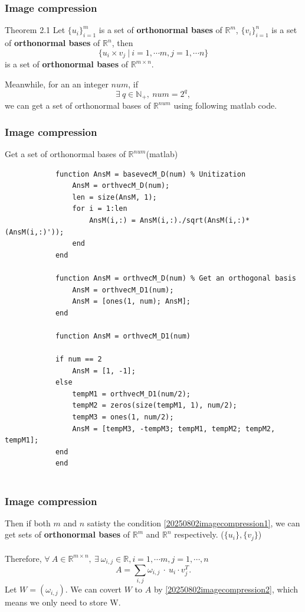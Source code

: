 \documentclass{beamer} %
\begin{document}
\begin{frame}
	\frametitle{Image compression}
	\begin{block}{Theorem 2.1}
		Let $\{u_{i}\}_{i=1}^{m}$ is a set of \textbf{orthonormal bases} of $\mathbb{R}^{m}$, $\{v_{i}\}_{i=1}^{n}$ is a set of \textbf{orthonormal bases} of $\mathbb{R}^{n}$, then
		$$\{u_{i}\times v_{j}\ |\ i = 1,\cdots m, j=1,\cdots n\}$$
		is a set of \textbf{orthonormal bases} of $\mathbb{R}^{m\times n}$.
	\end{block}
	Meanwhile, for an an integer $num$, if
	\begin{equation}
		\exists\ q \in\mathbb{N}_{+},\ num = 2^{q}, \tag{2.1}\label{20250802imagecompression1}
	\end{equation}
	we can get a set of orthonormal bases of $\mathbb{R}^{num}$ using following matlab code.
\end{frame}
\begin{frame}[fragile]
	\frametitle{Image compression}
	\begin{block}{Get a set of orthonormal bases of $\mathbb{R}^{num}$(matlab)}
		\begin{lstlisting}
			function AnsM = basevecM_D(num) % Unitization
				AnsM = orthvecM_D(num);
				len = size(AnsM, 1);
				for i = 1:len
					AnsM(i,:) = AnsM(i,:)./sqrt(AnsM(i,:)*(AnsM(i,:)'));
				end
			end
			
			function AnsM = orthvecM_D(num) % Get an orthogonal basis
				AnsM = orthvecM_D1(num);
				AnsM = [ones(1, num); AnsM];
			end
			
			function AnsM = orthvecM_D1(num) 
			
			if num == 2
				AnsM = [1, -1];
			else 
				tempM1 = orthvecM_D1(num/2);
				tempM2 = zeros(size(tempM1, 1), num/2);
				tempM3 = ones(1, num/2);
				AnsM = [tempM3, -tempM3; tempM1, tempM2; tempM2, tempM1];
			end
			end
			
		\end{lstlisting}
	\end{block}
\end{frame}
\begin{frame}
	\frametitle{Image compression}
	Then if both $m$ and $n$ satisty the condition \eqref{20250802imagecompression1}, we can get  sets of \textbf{orthonormal bases} of $\mathbb{R}^{m}$ and $\mathbb{R}^{n}$  respectively. ($\{u_{i}\},\{v_{j}\}$)\\ \ \\
	Therefore, $\forall\ A \in \mathbb{R}^{m\times n},\ \exists\ \omega_{i,j}\in\mathbb{R}, i = 1, \cdots m, j = 1, \cdots, n$
	\begin{equation}
		A = \sum_{i,j}\omega_{i,j}\ \cdot \ u_{i} \cdot v_{j}^{T}. \tag{2.2}\label{20250802imagecompression2}
	\end{equation}
	Let $W = (\omega_{i,j})$. We can covert $W$ to $A$ by \eqref{20250802imagecompression2}, which means we only need to store W.
\end{frame}
\end{document}
